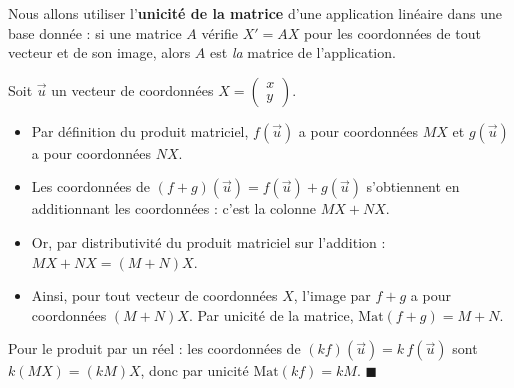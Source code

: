 \documentclass[11pt]{article}
\begin{document}
\begin{experience}
Nous allons utiliser l'\textbf{unicité de la matrice} d'une application linéaire dans une base donnée : si une matrice $A$ vérifie $X' = AX$ pour les coordonnées de tout vecteur et de son image, alors $A$ est \emph{la} matrice de l'application.

Soit $\vec{u}$ un vecteur de coordonnées $X = \begin{pmatrix} x \\ y \end{pmatrix}$.
\begin{itemize}
\item[\textbf{Étape 1.}] Par définition du produit matriciel, $f(\vec{u})$ a pour coordonnées $MX$ et $g(\vec{u})$ a pour coordonnées $NX$.
\item[\textbf{Étape 2.}] Les coordonnées de $(f+g)(\vec{u}) = f(\vec{u}) + g(\vec{u})$ s'obtiennent en additionnant les coordonnées : c'est la colonne $MX + NX$.
\item[\textbf{Étape 3.}] Or, par distributivité du produit matriciel sur l'addition : $MX + NX = (M+N)X$.
\item[\textbf{Étape 4.}] Ainsi, pour tout vecteur de coordonnées $X$, l'image par $f+g$ a pour coordonnées $(M+N)X$. Par unicité de la matrice, $\mathrm{Mat}(f+g) = M+N$.
\end{itemize}
Pour le produit par un réel : les coordonnées de $(kf)(\vec{u}) = k\,f(\vec{u})$ sont $k(MX) = (kM)X$, donc par unicité $\mathrm{Mat}(kf) = kM$. \hfill$\blacksquare$
\end{experience}
\end{document}
